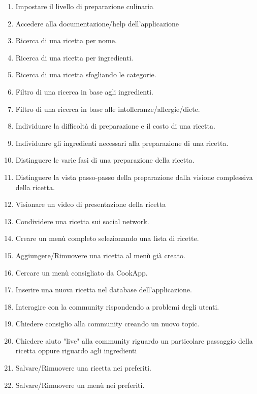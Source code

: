 \begin{enumerate}
\label{tasks}

\item Impostare il livello di preparazione culinaria
\item Accedere alla documentazione/help dell'applicazione

\item Ricerca di una ricetta per nome.
\item Ricerca di una ricetta per ingredienti.

\item Ricerca di una ricetta sfogliando le categorie.

\item Filtro di una ricerca in base agli ingredienti.
\item Filtro di una ricerca in base alle intolleranze/allergie/diete.

\item Individuare la difficoltà di preparazione e il costo di una ricetta.
\item Individuare gli ingredienti necessari alla preparazione di una ricetta.
\item Distinguere le varie fasi di una preparazione della ricetta.
\item Distinguere la vista passo-passo della preparazione dalla visione complessiva della ricetta.
\item Visionare un video di presentazione della ricetta
\item Condividere una ricetta sui social network.
\item Creare un menù completo selezionando una lista di ricette.
\item Aggiungere/Rimuovere una ricetta al menù già creato.
\item Cercare un menù consigliato da CookApp.

\item Inserire una nuova ricetta nel database dell'applicazione.
\item Interagire con la community rispondendo a problemi degli utenti.
\item Chiedere consiglio alla community creando un nuovo topic.
\item Chiedere aiuto "live" alla community riguardo un particolare passaggio della ricetta oppure riguardo agli ingredienti

\item Salvare/Rimuovere una ricetta nei preferiti.
\item Salvare/Rimuovere un menù nei preferiti.


\end{enumerate}

